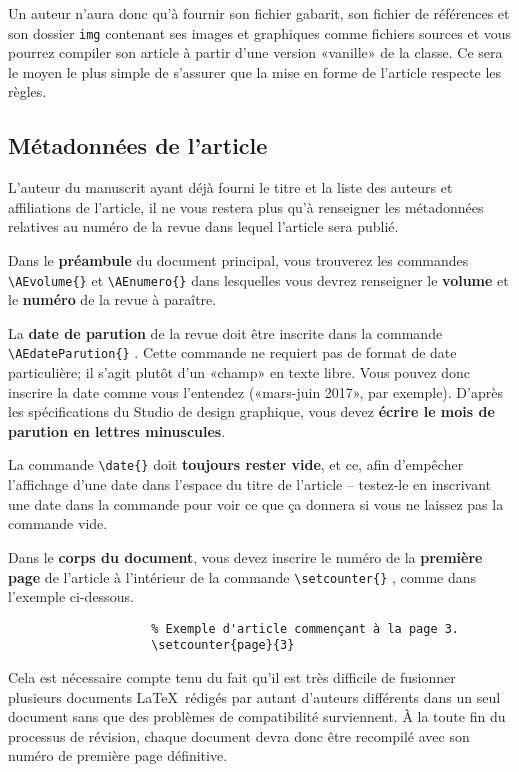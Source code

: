 \documentclass[french]{article}
\newcommand{\cmd}[1]{%
	\texttt{\textbackslash#1\{\}}
}
\begin{document}
			Un auteur n'aura donc qu'à fournir son fichier gabarit, son fichier de références et son dossier \texttt{img}
			contenant ses images et graphiques comme fichiers sources et vous pourrez compiler son article à partir d'une
			version «vanille» de la classe. Ce sera le moyen le plus simple de s'assurer que la mise en forme de l'article
			respecte les règles.
			
		\subsection{Métadonnées de l'article}
		
			L'auteur du manuscrit ayant déjà fourni le titre et la liste des auteurs et affiliations de l'article, il ne vous
			restera plus qu'à renseigner les métadonnées relatives au numéro de la revue dans lequel l'article sera publié.
			
			Dans le \textbf{préambule} du document principal, vous trouverez les commandes \cmd{AEvolume} et \cmd{AEnumero} dans
			lesquelles vous devrez renseigner le \textbf{volume} et le \textbf{numéro} de la revue à paraître.
			
			La \textbf{date de parution} de la revue doit être inscrite dans la commande \cmd{AEdateParution}. Cette commande ne requiert
			pas de
			format de date particulière; il s'agit plutôt d'un «champ» en texte libre. Vous pouvez donc inscrire la date comme
			vous l'entendez («mars-juin 2017», par exemple). D'après les spécifications du Studio de design graphique, vous devez
			\textbf{écrire le mois de parution en lettres minuscules}.
			
			La commande \cmd{date} doit \textbf{toujours rester vide}, et ce, afin d'empêcher l'affichage d'une date dans l'espace du
			titre de l'article -- testez-le en inscrivant une date dans la commande pour voir ce que ça donnera si vous ne laissez
			pas la commande vide.
			
			Dans le \textbf{corps du document}, vous devez inscrire le numéro de la \textbf{première page} de 
			l'article à	l'intérieur de la commande \cmd{setcounter}, comme dans l'exemple ci-dessous.
			
			\begin{shaded*}
				\begin{verbatim}
					% Exemple d'article commençant à la page 3.
					\setcounter{page}{3}
				\end{verbatim}
			\end{shaded*}
			
			Cela est nécessaire compte tenu du fait qu'il est très difficile de fusionner plusieurs documents \LaTeX\ rédigés par autant
			d'auteurs différents dans un seul document sans que des problèmes de compatibilité surviennent. À la toute fin du processus de révision, 
			chaque document devra donc être recompilé avec son numéro de première page définitive.
			
\end{document}
